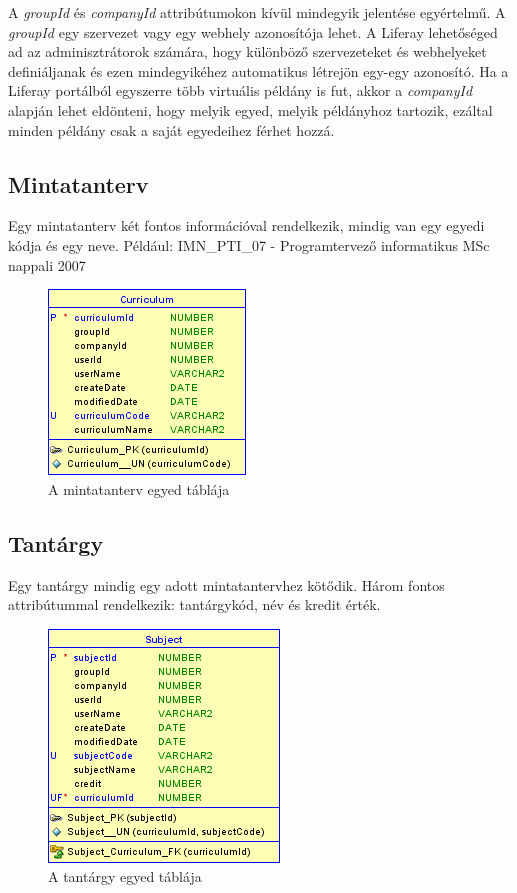 \documentclass[hidelinks, 12pt, a4paper]{report}
\begin{document}
A \emph{groupId} és \emph{companyId} attribútumokon kívül mindegyik jelentése egyértelmű. A \emph{groupId} egy szervezet vagy egy webhely azonosítója lehet. A Liferay lehetőséged ad az adminisztrátorok számára, hogy különböző szervezeteket és webhelyeket definiáljanak és ezen mindegyikéhez automatikus létrejön egy-egy azonosító. Ha a Liferay portálból egyszerre több virtuális példány is fut, akkor a \emph{companyId} alapján lehet eldönteni, hogy melyik egyed, melyik példányhoz tartozik, ezáltal minden példány csak a saját egyedeihez férhet hozzá.

\subsection{Mintatanterv}

Egy mintatanterv két fontos információval rendelkezik, mindig van egy egyedi kódja és egy neve. Például: IMN\_PTI\_07 - Programtervező informatikus MSc nappali 2007

\begin{figure}[H]
    \centering
	\includegraphics{curriculum.png}
	\caption{A mintatanterv egyed táblája}
\end{figure}

\subsection{Tantárgy}

Egy tantárgy mindig egy adott mintatantervhez kötődik. Három fontos attribútummal rendelkezik: tantárgykód, név és kredit érték.

\begin{figure}[H]
    \centering
	\includegraphics{subject.png}
	\caption{A tantárgy egyed táblája}
\end{figure}
\end{document}
